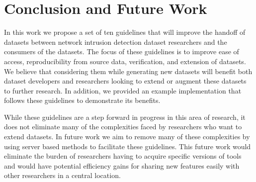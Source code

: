 \documentclass[conference]{IEEEtran}
\begin{document}
\section{Conclusion and Future Work}\label{sec:conclusion}
In this work we propose a set of ten guidelines that will improve the handoff of datasets between network intrusion detection dataset researchers and the consumers of the datasets.
The focus of these guidelines is to improve ease of access, reproducibility from source data, verification, and extension of datasets.
We believe that considering them while generating new datasets will benefit both dataset developers and researchers looking to extend or augment these datasets to further research.
In addition, we provided an example implementation that follows these guidelines to demonstrate its benefits.

While these guidelines are a step forward in progress in this area of research, it does not eliminate many of the complexities faced by researchers who want to extend datasets.
In future work we aim to remove many of these complexities by using server based methods to facilitate these guidelines.
This future work would eliminate the burden of researchers having to acquire specific versions of tools and would have potential efficiency gains for sharing new features easily with other researchers in a central location.



\end{document}
